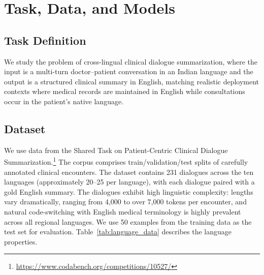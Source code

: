 \documentclass[conference]{IEEEtran}
\begin{document}
\section{Task, Data, and Models}
\label{Task}

\subsection{Task Definition}

We study the problem of cross-lingual clinical dialogue summarization,
where the input is a multi-turn doctor--patient conversation in an Indian
language and the output is a structured clinical summary in English,
matching realistic deployment contexts where medical records are maintained
in English while consultations occur in the patient's native language.

\subsection{Dataset}

We use data from the Shared Task on Patient-Centric Clinical Dialogue
Summarization.\footnote{\url{https://www.codabench.org/competitions/10527/}}
The corpus comprises train/validation/test splits of carefully annotated
clinical encounters. The dataset contains 231 dialogues across the ten
languages (approximately 20--25 per language), with each dialogue paired
with a gold English summary. The dialogues exhibit high linguistic
complexity: lengths vary dramatically, ranging from 4,000 to over 7,000
tokens per encounter, and natural code-switching with English medical
terminology is highly prevalent across all regional languages. We use 50
examples from the training data as the test set for evaluation.
Table~\ref{tab:language_data} describes the language properties.

\begin{table}[h!]
\centering
\caption{Language properties of the evaluation corpus.}
\label{tab:language_data}
\end{table}
\end{document}
